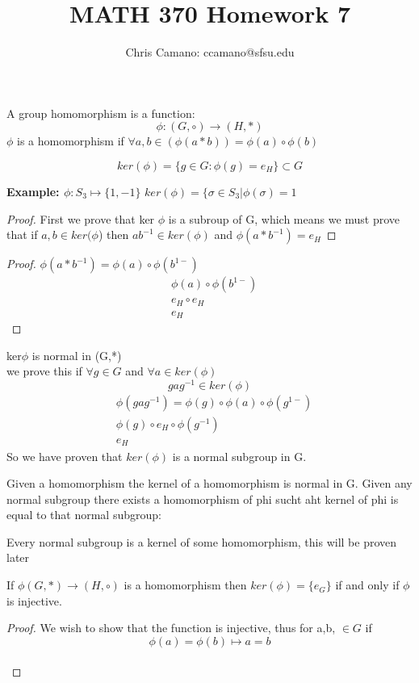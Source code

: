 \documentclass[11pt]{article}
\author{Chris Camano: ccamano@sfsu.edu}
\title{MATH 370  Homework 7 }
\date
\theoremstyle{definition}  %
\newcommand{\block}[2]{\begin{tcolorbox}[title={#1}]{#2}\end{tcolorbox}}
\begin{document}
\maketitle
\block{Definition}{
A group homomorphism is a function: \[
  \phi:(G,\circ)\rightarrow (H,*)
\]
$\phi$ is a homomorphism if $\forall a,b \in ( \phi(a*b))=\phi(a)\circ\phi(b)$
}

\block{Definition: Kernel of a homomorphism}{
\[
  ker(\phi)=\{g\in G : \phi(g)=e_H\}\subset G
\]
}

\textbf{Example: $\phi:S_3\mapsto\{1,-1\}$}
$ker(\phi)=\{\sigma\in S_3|\phi(\sigma)=1$

\block{Claim Given a homomorphism $\phi$ ker($\phi)$ is a normal subgroup of G\}}
{\begin{proof}
  First we prove that ker $\phi$ is a subroup of G, which means we must prove that if $a,b\in ker(\phi$) then $ab^{-1}\in ker(\phi)$ and $\phi(a*b^{-1})=e_H$
\end{proof}}
\begin{proof}
  $\phi(a*b^{-1})
=\phi(a)\circ \phi(b^{1-})$
\begin{align*}
  &\phi(a)\circ \phi(b^{1-})\\
  &e_H\circ e_H\\
  &e_H
\end{align*}
\end{proof}

\block{Proposition}{
ker$\phi$ is normal in (G,*)\\
we prove this if $\forall g\in G$ and $\forall a \in ker(\phi)$
\[
  gag^{-1}\in ker(\phi)
\]
\begin{align*}
  &\phi(gag^{-1})=\phi(g)\circ\phi(a)\circ\phi(g^{1-})\\
  &\phi(g)\circ e_H \circ\phi(g^{-1})\\
  &e_H
\end{align*}
So we have proven that $ker(\phi)$ is a normal subgroup in G.
}
Given a homomorphism the kernel of a homomorphism is normal in G. Given any normal subgroup there exists a homomorphism of phi sucht aht kernel of phi is equal to that normal subgroup:
\block{Theorem}{Every normal subgroup is a kernel of some homomorphism, this will be proven later}
\block{Theorem}{
 If $\phi(G,*)\rightarrow (H,\circ)$ is a homomorphism then $ker(\phi) =\{e_G\}$ if and only if $\phi$ is injective.
}
\begin{proof}
  We wish to show that the function is injective, thus for a,b, $\in G $  if \[
    \phi(a)=\phi(b)\mapsto a=b
  \]
  \\
\end{proof}
\end{document}
